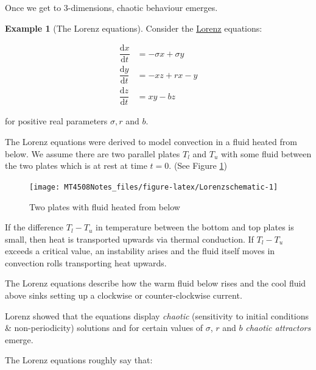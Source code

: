 \documentclass[
  a4paper,
  oneside,
  final]{krantz}
\renewcommand{\d}{\mathrm{d}}
\newcommand{\der}[2]{\dfrac{\d #1}{\d #2}}
\theoremstyle{definition}
\theoremstyle{definition}
\newtheorem{example}{Example}[chapter]
\theoremstyle{definition}
\theoremstyle{definition}
\theoremstyle{remark}
\begin{document}
Once we get to \(3\)-dimensions, chaotic behaviour emerges.

\begin{example}[The Lorenz equations]
\protect\hypertarget{exm:Lorenz-equations}{}\label{exm:Lorenz-equations}Consider the \href{https://mathshistory.st-andrews.ac.uk/Biographies/Lorenz_Edward/}{Lorenz} equations:

\begin{align}
\der{x}{t} &= -\sigma x + \sigma y \label{eq:Lorenz-equations1}\\
\der{y}{t} &= - x z + rx  -y \label{eq:Lorenz-equations2}\\
\der{z}{t} &= xy - bz
\label{eq:Lorenz-equations3}
\end{align}

for positive real parameters \(\sigma, r\) and \(b\).

The Lorenz equations were derived to model convection in a fluid heated from below. We assume there are two parallel plates \(T_{l}\) and \(T_{u}\) with some fluid between the two plates which is at rest at time \(t = 0\). (See Figure \ref{fig:Lorenzschematic})

\begin{figure}

{\centering \texttt{[image: MT4508Notes\_files/figure-latex/Lorenzschematic-1]} 

}

\caption{Two plates with fluid heated from below}\label{fig:Lorenzschematic}
\end{figure}

If the difference \(T_{l} - T_{u}\) in temperature between the bottom and top plates is small, then heat is transported upwards via thermal conduction. If \(T_{l} - T_{u}\) exceeds a critical value, an instability arises and the fluid itself moves in convection rolls transporting heat upwards.

The Lorenz equations describe how the warm fluid below rises and the cool fluid above sinks setting up a clockwise or counter-clockwise current.

Lorenz showed that the equations display \emph{chaotic} (sensitivity to initial conditions \& non-periodicity) solutions and for certain values of \(\sigma\), \(r\) and \(b\) \emph{chaotic attractors} emerge.

The Lorenz equations roughly say that:


\end{example}
\end{document}
